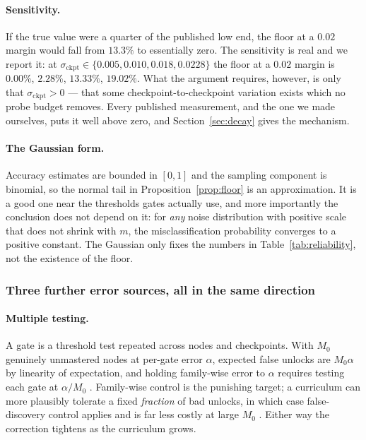 \documentclass[11pt]{article}
\theoremstyle{plain}
\theoremstyle{definition}
\theoremstyle{remark}
\begin{document}
\paragraph{Sensitivity.} If the true value were a quarter of the published low
end, the floor at a $0.02$ margin would fall from $13.3\%$ to essentially zero.
The sensitivity is real and we report it: at $\sigma_{\text{ckpt}} \in \{0.005,
0.010, 0.018, 0.0228\}$ the floor at a $0.02$ margin is $0.00\%$, $2.28\%$,
$13.33\%$, $19.02\%$. What the argument requires, however, is only that
$\sigma_{\text{ckpt}} > 0$ --- that some checkpoint-to-checkpoint variation
exists which no probe budget removes. Every published measurement, and the one we
made ourselves, puts it well above zero, and Section~\ref{sec:decay} gives the
mechanism.

\paragraph{The Gaussian form.} Accuracy estimates are bounded in $[0,1]$ and the
sampling component is binomial, so the normal tail in
Proposition~\ref{prop:floor} is an approximation. It is a good one near the
thresholds gates actually use, and more importantly the conclusion does not
depend on it: for \emph{any} noise distribution with positive scale that does not
shrink with $m$, the misclassification probability converges to a positive
constant. The Gaussian only fixes the numbers in
Table~\ref{tab:reliability}, not the existence of the floor.

\subsubsection{Three further error sources, all in the same direction}

\paragraph{Multiple testing.} A gate is a threshold test repeated across nodes
and checkpoints. With $M_0$ genuinely unmastered nodes at per-gate error
$\alpha$, expected false unlocks are $M_0\alpha$ by linearity of expectation, and
holding family-wise error to $\alpha$ requires testing each gate at $\alpha/M_0$
\citep{dunn1961multiple}. Family-wise control is the punishing target; a
curriculum can more plausibly tolerate a fixed \emph{fraction} of bad unlocks, in
which case false-discovery control applies and is far less costly at large $M_0$
\citep{benjamini1995controlling}. Either way the correction tightens as the
curriculum grows.
\end{document}
